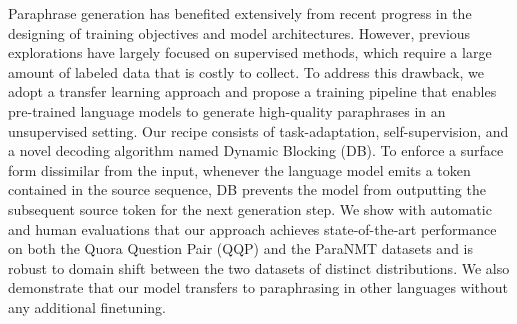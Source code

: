 Paraphrase generation has benefited extensively from recent progress in the designing of training objectives and model architectures. However, previous explorations have largely focused on supervised methods, which require a large amount of labeled data that is costly to collect. To address this drawback, we adopt a transfer learning approach and propose a training pipeline that enables pre-trained language models to generate high-quality paraphrases in an unsupervised setting. Our recipe consists of task-adaptation, self-supervision, and a novel decoding algorithm named Dynamic Blocking (DB). To enforce a surface form dissimilar from the input, whenever the language model emits a token contained in the source sequence, DB prevents the model from outputting the subsequent source token for the next generation step. We show with automatic and human evaluations that our approach achieves state-of-the-art performance on both the Quora Question Pair (QQP) and the ParaNMT datasets and is robust to domain shift between the two datasets of distinct distributions. We also demonstrate that our model transfers to paraphrasing in other languages without any additional finetuning.
